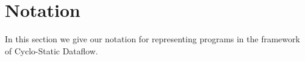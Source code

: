 \section{Notation}
\label{sec:pcg}


In this section we give our notation for representing programs in the
framework of Cyclo-Static Dataflow.

